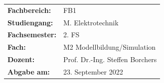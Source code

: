 \documentclass[
	pagesize,
	fontsize=12pt,
	paper=a4,
	oneside,
   reqno
]{scrartcl}
\numberwithin{equation}{section}
\numberwithin{table}{section}
\numberwithin{figure}{section}
\begin{document}
\begin{titlepage}
   \begin{tabular}{l l}
      \textbf{Fachbereich:}   & FB1                                                     \\
      \textbf{Studiengang:}   & M.\xspace Elektrotechnik                                \\
      \textbf{Fachsemester:}  & 2.\xspace FS                                            \\
      \textbf{Fach:}          & M2 Modellbildung/Simulation                             \\
      \textbf{Dozent:}        & Prof.\xspace Dr.\xspace -Ing.\xspace Steffen Borchers   \\
      \textbf{Abgabe am:}     & 23.\xspace September 2022                               \\ 
   \end{tabular}
\end{titlepage}
\clearpage

\renewcommand{\contentsname}{Inhaltsverzeichnis}
\tableofcontents
\clearpage

\renewcommand{\listfigurename}{Abbildungsverzeichnis}
\renewcommand*{\figurename}{Abb.}
\listoffigures

\renewcommand*{\listtablename}{Tabellenverzeichnis}
\renewcommand*{\tablename}{Tab.}
\listoftables
\clearpage





















\newpage
\pagestyle{scrheadings}
\newcount\Quellennummer
{}
\end{document}
